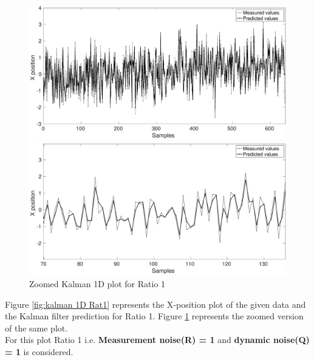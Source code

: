 \documentclass[12pt]{article}
\begin{document}
\begin{figure}[h]
\centering
\begin{minipage}{0.5\textwidth}
\centering
	\includegraphics[width = \textwidth]{./Figures/part1Ratio1.eps}
	\caption{Kalman 1D plot for Ratio 1}
	\label{fig:kalman 1D Rat1}
\end{minipage}%
\begin{minipage}{0.5\textwidth}
\centering
	\includegraphics[width = \textwidth]{./Figures/part1Ratio1zoomed.eps}
	\caption{ Zoomed Kalman 1D plot for Ratio 1}
	\label{fig: kalman 1D Rat1 zoom}
\end{minipage}
\end{figure}
\noindent
Figure \ref{fig:kalman 1D Rat1} represents the X-position plot of the given data and the Kalman filter prediction for Ratio 1. Figure \ref{fig: kalman 1D Rat1 zoom} represents the zoomed version of the same plot.\\
For this plot Ratio 1 i.e. \textbf{Measurement noise(R) = 1} and \textbf{dynamic noise(Q) = 1} is considered.\\
\end{document}
